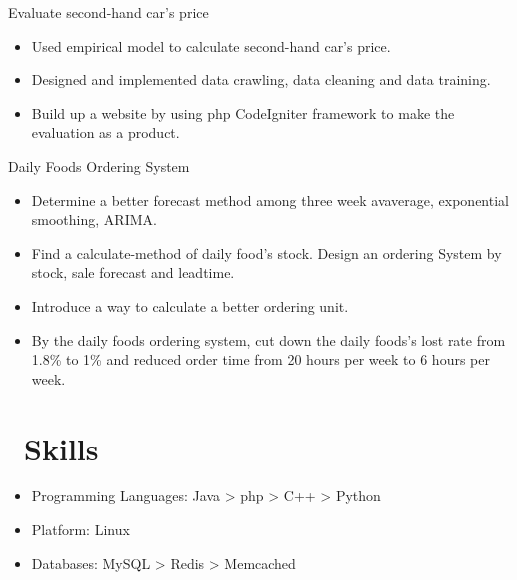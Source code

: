 \documentclass{resume}
\begin{document}
Evaluate second-hand car's price
\begin{itemize}
  \item Used empirical model to calculate second-hand car's price.
  \item Designed and implemented data crawling, data cleaning and data training. 
  \item Build up a website by using php CodeIgniter framework to make the evaluation as a product.
\end{itemize}

Daily Foods Ordering System
\begin{itemize}
  \item Determine a better forecast method among three week avaverage, exponential smoothing, ARIMA.
  \item Find a calculate-method of daily food’s stock. Design an ordering System by stock, sale forecast and leadtime.
  \item Introduce a way to calculate a better ordering unit.
  \item By the daily foods ordering system, cut down the daily foods's lost rate from 1.8\% to 1\% and reduced order time from 20 hours per week to 6 hours per week.
\end{itemize}

\section{\faCogs\ Skills}
\begin{itemize}[parsep=0.5ex]
  \item Programming Languages: Java > php > C++ > Python
  \item Platform: Linux
  \item Databases: MySQL > Redis > Memcached
\end{itemize}
\end{document}
